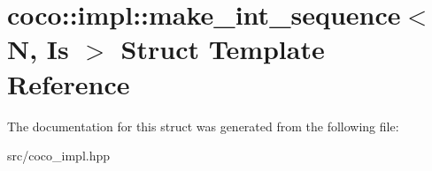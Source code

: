 \hypertarget{structcoco_1_1impl_1_1make__int__sequence}{}\section{coco\+:\+:impl\+:\+:make\+\_\+int\+\_\+sequence$<$ N, Is $>$ Struct Template Reference}
\label{structcoco_1_1impl_1_1make__int__sequence}


The documentation for this struct was generated from the following file\+:\begin{DoxyCompactItemize}
\item 
src/coco\+\_\+impl.\+hpp\end{DoxyCompactItemize}
